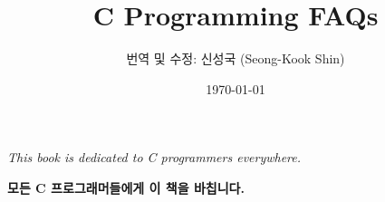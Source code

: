 \documentclass[10pt,a4paper,draft]{report}
\title{C Programming FAQs}
\author{번역 및 수정: 신성국 (Seong-Kook Shin)}
\date{\today}
\newcommand{\BF}[1]{\textbf{#1}}
\newcommand{\EM}[1]{\textit{#1}}
\begin{document}

\pagestyle{headings}
\maketitle

\vspace{10em}
\begin{center}
\EM{This book is dedicated to C programmers everywhere.}

\vspace{2cm}

\BF{모든 C 프로그래머들에게 이 책을 바칩니다.}
\end{center}

\newpage
\tableofcontents



\newpage


\newpage


\newpage


\newpage


\newpage


\newpage


\newpage


\newpage


\newpage


\newpage


\newpage


\newpage


\newpage


\newpage


\newpage


\newpage


\newpage


\newpage


\newpage


\newpage


\newpage


\newpage 

\newpage 
        
\newpage

\end{document}

